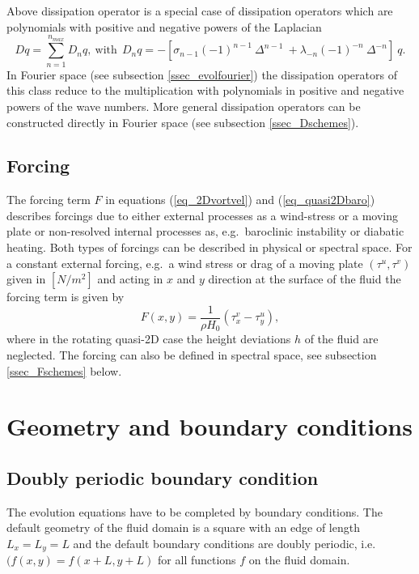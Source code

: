 Above dissipation operator is a special case of dissipation operators 
which are polynomials with positive and negative powers of the Laplacian
\begin{equation} \label{eq_Laplace_dissip_poly}
  D q = \sum_{n = 1}^{n_{max}} D_{n} q,
  \ \mbox{with} \ \
  D_{n} q 
   = 
 -\left[
   \sigma_{n-1} \left(-1 \right)^{n-1} \ \Delta^{n-1}
   \ +
   \lambda_{-n} \left(-1 \right)^{-n} \ \Delta^{-n}
  \right] \ q.
\end{equation}
In Fourier space (see subsection \ref{ssec_evolfourier}) the dissipation 
operators of this class reduce to the multiplication with polynomials 
in positive and negative powers of the wave numbers. More general 
dissipation operators can be constructed directly in Fourier space 
(see subsection \ref{ssec_Dschemes}).

\subsection{Forcing}
The forcing term $F$ in equations (\ref{eq_2Dvortvel}) and 
(\ref{eq_quasi2Dbaro}) describes forcings due to either 
external processes as a wind-stress or a moving plate or
non-resolved internal processes as, e.g.\ baroclinic instability 
or diabatic heating. Both types of forcings can be described 
in physical or spectral space. For a constant external forcing, 
e.g.\ a wind stress or drag of a moving plate $(\tau^{u},\tau^{v})$ 
given in $[N/m^{2}]$ and acting in $x$ and $y$ direction at the surface 
of the fluid the forcing term is given by 
\begin{equation} \label{eq_Fstressdrag}
 F(x,y) = \frac{1}{\rho H_{0}} \left( \tau_{x}^{v} - \tau_{y}^{u} \right),
\end{equation}
where in the rotating quasi-2D case the height deviations $h$ of the
fluid are neglected. The forcing can also be defined in spectral
space, see subsection \ref{ssec_Fschemes} below.
\section{Geometry and boundary conditions}
%
\subsection{Doubly periodic boundary condition}
%
The evolution equations have to be completed by boundary conditions.  
The default geometry of the fluid domain is a square with an edge of length
$L_{x} = L_{y} = L$ and the default boundary conditions are doubly periodic,  
i.e.\ $(f(x,y) = f(x+L,y+L)$ for all functions $f$ on the fluid domain.
%
